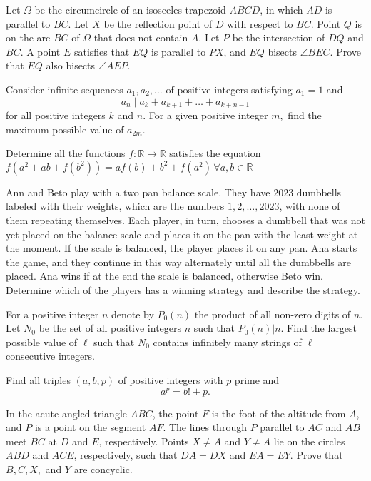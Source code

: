 \documentclass[11pt]{scrartcl}
\begin{document}
\begin{problem}[165465510156789]
	Let $\Omega$ be the circumcircle of an isosceles trapezoid $ABCD$, in which $AD$ is parallel to $BC$. Let $X$ be the reflection point of $D$ with respect to $BC$. Point $Q$ is on the arc $BC$ of $\Omega$ that does not contain $A$. Let $P$ be the intersection of $DQ$ and $BC$. A point $E$ satisfies that $EQ$ is parallel to $PX$, and $EQ$ bisects $\angle BEC$. Prove that $EQ$ also bisects $\angle AEP$.
\end{problem}
\begin{problem}[888114441475156]
Consider infinite sequences $a_1,a_2,\dots$ of positive integers satisfying $a_1=1$ and$$a_n \mid a_k+a_{k+1}+\dots+a_{k+n-1}$$for all positive integers $k$ and $n.$ For a given positive integer $m,$ find the maximum possible value of $a_{2m}.$
\end{problem}
\begin{problem}[664494485253935]
Determine all the functions $f:\mathbb R\mapsto\mathbb R$ satisfies the equation
$f(a^2 +ab+ f(b^2))=af(b)+b^2+ f(a^2)\,\forall a,b\in\mathbb R $
\end{problem}
\begin{problem}[6819074419096549446]
Ann and Beto play with a two pan balance scale. They have $2023$ dumbbells labeled with their weights, which are the numbers $1, 2, \dots, 2023$, with none of them repeating themselves. Each player, in turn, chooses a dumbbell that was not yet placed on the balance scale and places it on the pan with the least weight at the moment. If the scale is balanced, the player places it on any pan. Ana starts the game, and they continue in this way alternately until all the dumbbells are placed. Ana wins if at the end the scale is balanced, otherwise Beto win. Determine which of the players has a winning strategy and describe the strategy.
\end{problem}
\begin{problem}[504512181993018]
For a positive integer $n$ denote by $P_0(n)$ the product of all non-zero digits of $n$. Let $N_0$ be the set of all positive integers $n$ such that $P_0(n)|n$. Find the largest possible value of $\ell$ such that $N_0$ contains infinitely many strings of $\ell$ consecutive integers.
\end{problem}
\begin{problem}[627600286851318227]
Find all triples $(a,b,p)$ of positive integers with $p$ prime and\[ a^p=b!+p. \]
\end{problem}
\begin{problem}[5873161915777778529]
In the acute-angled triangle $ABC$, the point $F$ is the foot of the altitude from $A$, and $P$ is a point on the segment $AF$. The lines through $P$ parallel to $AC$ and $AB$ meet $BC$ at $D$ and $E$, respectively. Points $X \ne A$ and $Y \ne A$ lie on the circles $ABD$ and $ACE$, respectively, such that $DA = DX$ and $EA = EY$.
Prove that $B, C, X,$ and $Y$ are concyclic.
\end{problem}
\end{document}
